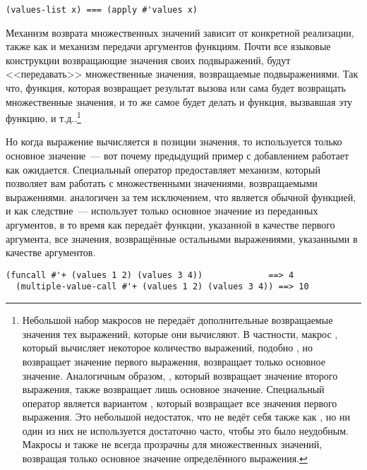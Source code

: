 \begin{lstlisting}[style=lisprepl]
  (values-list x) === (apply #'values x)
\end{lstlisting}

Механизм возврата множественных значений зависит от конкретной реализации, также как и
механизм передачи аргументов функциям.  Почти все языковые конструкции возвращающие
значения своих подвыражений, будут <<передавать>> множественные значения, возвращаемые
подвыражениями.  Так что, функция, которая возвращает результат вызова  или
 сама будет возвращать множественные значения, и то же самое будет
делать и функция, вызвавшая эту функцию, и т.д..\footnote{Небольшой набор макросов не
  передаёт дополнительные возвращаемые значения тех выражений, которые они вычисляют.  В
  частности, макрос , который вычисляет некоторое количество выражений,
  подобно , но возвращает значение первого выражения, возвращает только
  основное значение.  Аналогичным образом, , который возвращает значение
  второго выражения, также возвращает лишь основное значение.  Специальный оператор
   является вариантом , который возвращает все
  значения первого выражения.  Это небольшой недостаток, что  не ведёт себя
  также как , но ни один из них не используется достаточно
  часто, чтобы это было неудобным.  Макросы  и  также не всегда
  прозрачны для множественных значений, возвращая только основное значение определённого
  выражения.}

Но когда выражение вычисляется в позиции значения, то используется только основное
значение~--- вот почему предыдущий пример с добавлением работает как ожидается. Специальный
оператор  предоставляет механизм, который позволяет вам работать
с множественными значениями, возвращаемыми выражениями. 
аналогичен  за тем исключением, что  является обычной
функцией, и как следствие~--- использует только основное значение из переданных аргументов,
в то время как  передаёт функции, указанной в качестве первого
аргумента, все значения, возвращённые остальными выражениями, указанными в качестве
аргументов.

\begin{lstlisting}[style=lisprepl]
  (funcall #'+ (values 1 2) (values 3 4))             ==> 4
  (multiple-value-call #'+ (values 1 2) (values 3 4)) ==> 10
\end{lstlisting}

